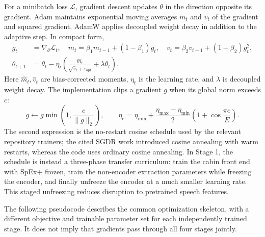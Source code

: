 For a minibatch loss $\mathcal{L}$, gradient descent updates $\theta$ in the direction opposite its gradient. Adam maintains exponential moving averages $m_t$ and $v_t$ of the gradient and squared gradient. AdamW applies decoupled weight decay in addition to the adaptive step. In compact form,
\begin{align}
  g_t&=\nabla_{\theta}\mathcal{L}_t,\quad
  m_t=\beta_1m_{t-1}+(1-\beta_1)g_t,\quad
  v_t=\beta_2v_{t-1}+(1-\beta_2)g_t^2,\\
  \theta_{t+1}&=\theta_t-\eta_t\left(\frac{\widehat{m}_t}{\sqrt{\widehat{v}_t}+\varepsilon_{\mathrm{opt}}}+\lambda\theta_t\right).
  \label{eq:adamw}
\end{align}
Here $\widehat m_t,\widehat v_t$ are bias-corrected moments, $\eta_t$ is the learning rate, and $\lambda$ is decoupled weight decay. The implementation clips a gradient $g$ when its global norm exceeds $c$:
\begin{equation}
  g\leftarrow g\min\!\left(1,\frac{c}{\lVert g\rVert_2}\right),
  \qquad
  \eta_e=\eta_{\min}+\frac{\eta_{\max}-\eta_{\min}}{2}\left(1+\cos\frac{\pi e}{E}\right).
  \label{eq:clip-cosine}
\end{equation}
The second expression is the no-restart cosine schedule used by the relevant repository trainers; the cited SGDR work introduced cosine annealing with warm restarts, whereas the code uses ordinary cosine annealing. In Stage 1, the schedule is instead a three-phase transfer curriculum: train the cabin front end with SpEx+ frozen, train the non-encoder extraction parameters while freezing the encoder, and finally unfreeze the encoder at a much smaller learning rate. This staged unfreezing reduces disruption to pretrained speech features.

The following pseudocode describes the common optimization skeleton, with a different objective and trainable parameter set for each independently trained stage. It does not imply that gradients pass through all four stages jointly.


